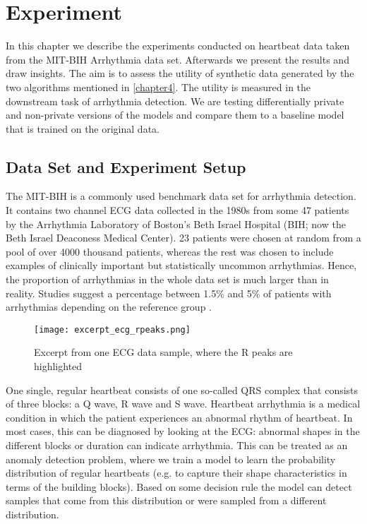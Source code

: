 \section{Experiment}
In this chapter we describe the experiments conducted on heartbeat data taken from the MIT-BIH Arrhythmia data set. Afterwards we present the results and draw insights. The aim is to assess the utility of synthetic data generated by the two algorithms mentioned in \cref{chapter4}. The utility is measured in the downstream task of arrhythmia detection. We are testing differentially private and non-private versions of the models and compare them to a baseline model that is trained on the original data.

\subsection{Data Set and Experiment Setup}
The MIT-BIH is a commonly used benchmark data set for arrhythmia detection. It contains two channel ECG data collected in the 1980s from some 47 patients by the Arrhythmia Laboratory of Boston's Beth Israel Hospital (BIH; now the Beth Israel Deaconess Medical Center). 23 patients were chosen at random from a pool of over 4000 thousand patients, whereas the rest was chosen to include examples of clinically important but statistically uncommon arrhythmias. Hence, the proportion of arrhythmias in the whole data set is much larger than in reality. Studies suggest a percentage between 1.5\% and 5\% of patients with arrhythmias depending on the reference group \parencite{desai2022arrhythmias}. 

\begin{figure}[h]
    \centering
    \texttt{[image: excerpt\_ecg\_rpeaks.png]}
    \caption{Excerpt from one ECG data sample, where the R peaks are highlighted}
\end{figure}

One single, regular heartbeat consists of one so-called QRS complex that consists of three blocks: a Q wave, R wave and S wave. Heartbeat arrhythmia is a medical condition in which the patient experiences an abnormal rhythm of heartbeat. In most cases, this can be diagnosed by looking at the ECG: abnormal shapes in the different blocks or duration can indicate arrhythmia. This can be treated as an anomaly detection problem, where we train a model to learn the probability distribution of regular heartbeats (e.g. to capture their shape characteristics in terms of the building blocks). Based on some decision rule the model can detect samples that come from this distribution or were sampled from a different distribution.

